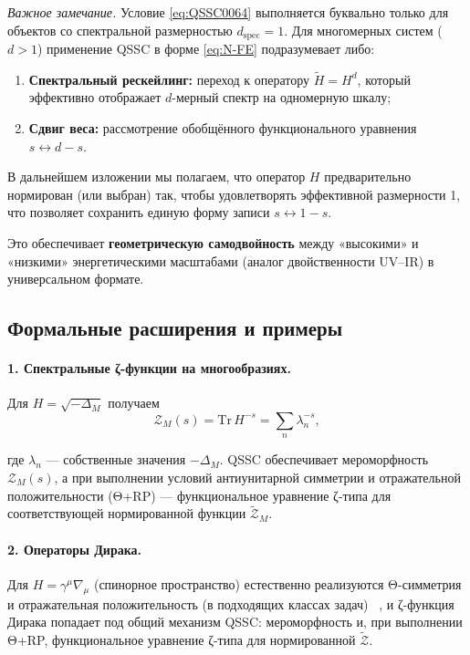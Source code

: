 \documentclass{article}
\numberwithin{equation}{section}
\theoremstyle{plain}
\theoremstyle{definition}
\theoremstyle{remark}
\def\leftrightarrow{↔}%
\begin{document}
\medskip
\noindent
\emph{Важное замечание.} Условие \eqref{eq:QSSC0064} выполняется буквально только для объектов со спектральной размерностью \(d_{\mathrm{spec}}=1\). Для многомерных систем (\(d>1\)) применение QSSC в форме \eqref{eq:N-FE} подразумевает либо:
\begin{enumerate}[label=(\alph*)]
    \item \textbf{Спектральный рескейлинг:} переход к оператору \(\tilde{H} = H^d\), который эффективно отображает \(d\)-мерный спектр на одномерную шкалу;
    \item \textbf{Сдвиг веса:} рассмотрение обобщённого функционального уравнения \(s \leftrightarrow d-s\).
\end{enumerate}
В дальнейшем изложении мы полагаем, что оператор \(H\) предварительно нормирован (или выбран) так, чтобы удовлетворять эффективной размерности 1, что позволяет сохранить единую форму записи \(s \leftrightarrow 1-s\).

Это обеспечивает \textbf{геометрическую самодвойность} между «высокими» и «низкими» энергетическими масштабами (аналог двойственности UV–IR) в универсальном формате.

\subsection*{Формальные расширения и примеры}

\paragraph{1. Спектральные ζ-функции на многообразиях.}
Для \(H=\sqrt{-\Delta_M}\) получаем
\begin{equation}
\mathcal Z_M(s)=\mathrm{Tr}\,H^{-s}=\sum_n \lambda_n^{-s},
\label{eq:QSSC0065}
\end{equation}

где \(\lambda_n\) — собственные значения \(-\Delta_M\).  
QSSC обеспечивает мероморфность $\mathcal Z_M(s)$, а при выполнении
условий антиунитарной симметрии и отражательной положительности (Θ+RP)
— функциональное уравнение ζ-типа для соответствующей нормированной функции
$\widetilde{\mathcal Z}_M$.

\paragraph{2. Операторы Дирака.}
Для \(H=\gamma^\mu\nabla_\mu\) (спинорное пространство) естественно реализуются
Θ-симметрия и отражательная положительность (в подходящих классах задач) ~\cite{Thaller1992, BerlineGetzlerVergne1992},
и ζ-функция Дирака попадает под общий механизм QSSC:
мероморфность и, при выполнении Θ+RP, функциональное уравнение ζ-типа
для нормированной $\widetilde{\mathcal Z}$.
\end{document}
